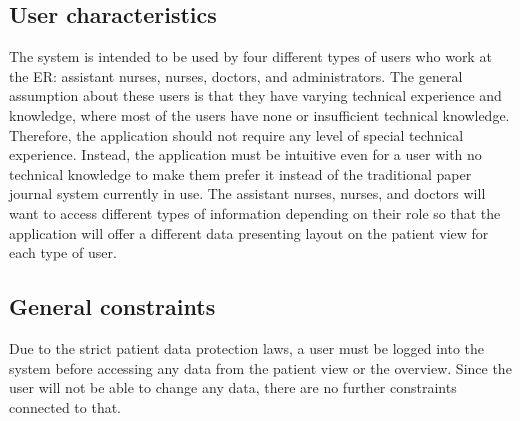 \subsection{User characteristics}
The system is intended to be used by four different types of users who work at the ER: assistant nurses, nurses, doctors, and administrators. The general assumption about these users is that they have varying technical experience and knowledge, where most of the users have none or insufficient technical knowledge. Therefore, the application should not require any level of special technical experience. Instead, the application must be intuitive even for a user with no technical knowledge to make them prefer it instead of the traditional paper journal system currently in use.
The assistant nurses, nurses, and doctors will want to access different types of information depending on their role so that the application will offer a different data presenting layout on the patient view for each type of user.
\subsection{General constraints}
Due to the strict patient data protection laws, a user must be logged into the system before accessing any data from the patient view or the overview. Since the user will not be able to change any data, there are no further constraints connected to that. 

